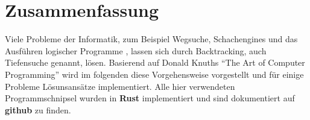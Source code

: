 \chapter*{Zusammenfassung}

Viele Probleme der Informatik, zum Beispiel Wegsuche, Schachengines und 
das Ausführen logischer Programme \cite[p. ~19]{DBLP:journals/jlp/SomogyiHC96}, lassen sich durch Backtracking, auch Tiefensuche genannt, lösen.
Basierend auf Donald Knuths "`The Art of Computer Programming"'\cite{TAOCP} wird im folgenden diese Vorgehensweise 
vorgestellt und für einige Probleme Lösunsansätze implementiert. Alle hier verwendeten Programmschnipsel wurden in \textbf{Rust} implementiert und sind
dokumentiert auf \textbf{github}\cite{Kauschke} zu finden.
